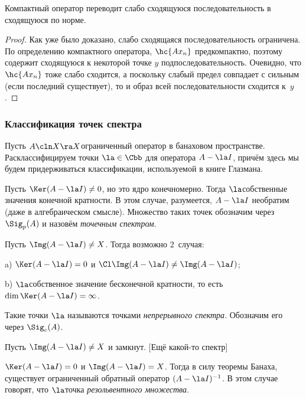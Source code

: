 \documentclass[a4paper]{article}
\begin{document}
\begin{imp}
Компактный оператор переводит слабо сходящуюся последовательность в сходящуюся по норме.
\end{imp}
\begin{proof}
Как уже было доказано, слабо сходящаяся последовательность ограничена.
По определению компактного оператора, $\hc{A x_n}$ предкомпактно,
поэтому содержит сходящуюся к некоторой точке $y$ подпоследовательность. Очевидно, что $\hc{Ax_n}$
тоже слабо сходится, а поскольку слабый предел совпадает с сильным (если последний существует),
то и образ всей последовательности сходится к~$y$.
\end{proof}


\subsubsection{Классификация точек спектра}

Пусть $A\cln X \ra X$\т ограниченный оператор в банаховом пространстве. Расклассифицируем точки $\la \in \Cbb$
для оператора $A - \la I$, причём здесь мы будем придерживаться классификации, используемой в книге Глазмана.

\begin{items}{-2}
\item Пусть $\Ker(A-\la I) \neq 0$, но это ядро конечномерно. Тогда $\la$\т собственные значения
конечной кратности. В этом случае, разумеется, $A - \la I$ необратим (даже в алгебраическом смысле).
Множество таких точек обозначим через $\Sig_p(A)$ и назовём \emph{точечным спектром}.
\item Пусть $\Img(A - \la I) \neq X$. Тогда возможно $2$~случая:
  \begin{items}{-2}
  \item[a)] $\Ker(A-\la I) = 0$ и $\Cl \Img (A - \la I) \neq \Img(A - \la I)$;
  \item[b)] $\la$\т собственное значение бесконечной кратности, то есть $\dim \Ker(A - \la I) = \infty$.
  \end{items}
  Такие точки $\la$ называются точками \emph{непрерывного спектра}. Обозначим его через $\Sig_c(A)$.
\item Пусть $\Img(A - \la I) \neq X$ и замкнут. [Ещё какой-то спектр]
\item $\Ker(A - \la I) = 0$ и $\Img(A - \la I) = X$. Тогда в силу теоремы Банаха, существует
  ограниченный обратный оператор $(A - \la I)^{-1}$. В этом случае говорят, что $\la$\т точка
  \emph{резольвентного множества}.
\end{items}
\end{document}
